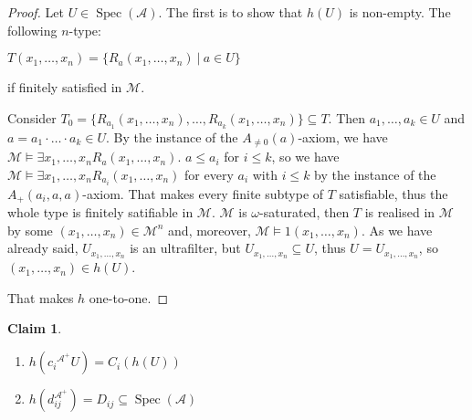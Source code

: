 \documentclass[a4paper]{article}
\theoremstyle{defin}
\theoremstyle{theorem}
\theoremstyle{claim}
\newtheorem{claim}{Claim}
\theoremstyle{prop}
\theoremstyle{lemma}
\theoremstyle{fact}
\theoremstyle{ex}
\theoremstyle{col}
\begin{document}
\begin{proof}
Let $U \in \operatorname{Spec}(\mathcal{A})$. The first is to show that $h(U)$ is non-empty. The following $n$-type:
\begin{center}
$T(x_1, \dots, x_n) = \{ R_a(x_1, \dots, x_n) \: | \: a \in U \}$
\end{center}
if finitely satisfied in $\mathcal{M}$.

Consider $T_0 = \{ R_{a_1}(x_1, \dots, x_n), \dots, R_{a_k}(x_1, \dots, x_n) \} \subseteq T$. Then $a_1, \dots, a_k \in U$ and $a = a_1 \cdot \dots \cdot a_k \in U$. By the instance of the $A_{\neq 0}(a)$-axiom, we have $\mathcal{M} \models \exists x_1, \dots, x_n R_a(x_1, \dots, x_n)$.
$a \leq a_i$ for $i \leq k$, so we have $\mathcal{M} \models \exists x_1, \dots, x_n R_{a_i}(x_1, \dots, x_n)$ for every $a_i$ with $i \leq k$ by the instance of the $A_{+}(a_i, a, a)$-axiom. That makes every finite subtype of $T$ satisfiable, thus the whole type is finitely satifiable in $\mathcal{M}$.
$\mathcal{M}$ is $\omega$-saturated, then $T$ is realised in $\mathcal{M}$ by some $(x_1, \dots, x_n) \in \mathcal{M}^n$ and, moreover, $\mathcal{M} \models 1(x_1, \dots, x_n)$. As we have already said, $U_{x_1, \dots, x_n}$ is an ultrafilter, but $U_{x_1, \dots, x_n} \subseteq U$, thus $U = U_{x_1, \dots, x_n}$, so $(x_1, \dots, x_n) \in h(U)$.

That makes $h$ one-to-one.
\end{proof}

\begin{claim}
$ $

\begin{enumerate}
\item $h(c_i{^{\mathcal{A}^{+}}} U) = C_i (h(U))$
\item $h(d_{ij}^{\mathcal{A}^{+}}) = D_{ij} \subseteq \operatorname{Spec}(\mathcal{A})$
\end{enumerate}
\end{claim}
\end{document}
